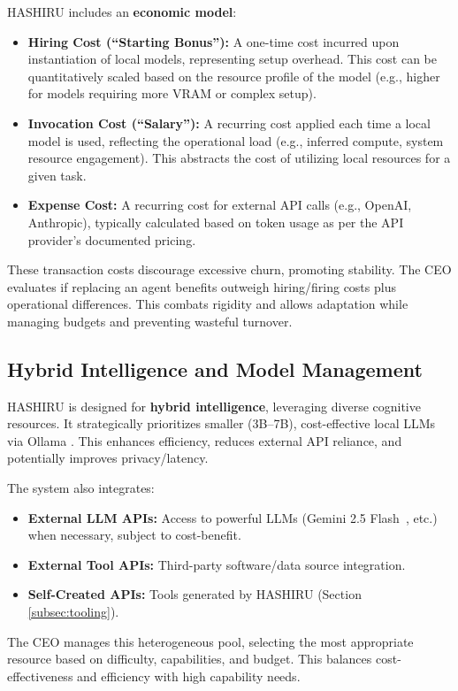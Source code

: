 \documentclass[conference]{IEEEtran}
\begin{document}
HASHIRU includes an \textbf{economic model}:
\begin{itemize}
    \item \textbf{Hiring Cost (``Starting Bonus''):} A one-time cost incurred upon instantiation of local models, representing setup overhead. This cost can be quantitatively scaled based on the resource profile of the model (e.g., higher for models requiring more VRAM or complex setup).
    \item \textbf{Invocation Cost (``Salary''):} A recurring cost applied each time a local model is used, reflecting the operational load (e.g., inferred compute, system resource engagement). This abstracts the cost of utilizing local resources for a given task.
    \item \textbf{Expense Cost:} A recurring cost for external API calls (e.g., OpenAI, Anthropic), typically calculated based on token usage as per the API provider's documented pricing.
\end{itemize}
These transaction costs discourage excessive churn, promoting stability. The CEO evaluates if replacing an agent benefits outweigh hiring/firing costs plus operational differences. This combats rigidity and allows adaptation while managing budgets and preventing wasteful turnover.

\subsection{Hybrid Intelligence and Model Management}
HASHIRU is designed for \textbf{hybrid intelligence}, leveraging diverse cognitive resources. It strategically prioritizes smaller (3B--7B), cost-effective local LLMs via Ollama \cite{ollama}. This enhances efficiency, reduces external API reliance, and potentially improves privacy/latency.

The system also integrates:
\begin{itemize}
    \item \textbf{External LLM APIs:} Access to powerful LLMs (Gemini 2.5 Flash~\cite{gemini25flash}, etc.) when necessary, subject to cost-benefit.
    \item \textbf{External Tool APIs:} Third-party software/data source integration.
    \item \textbf{Self-Created APIs:} Tools generated by HASHIRU (Section \ref{subsec:tooling}).
\end{itemize}
The CEO manages this heterogeneous pool, selecting the most appropriate resource based on difficulty, capabilities, and budget. This balances cost-effectiveness and efficiency with high capability needs.
\end{document}
